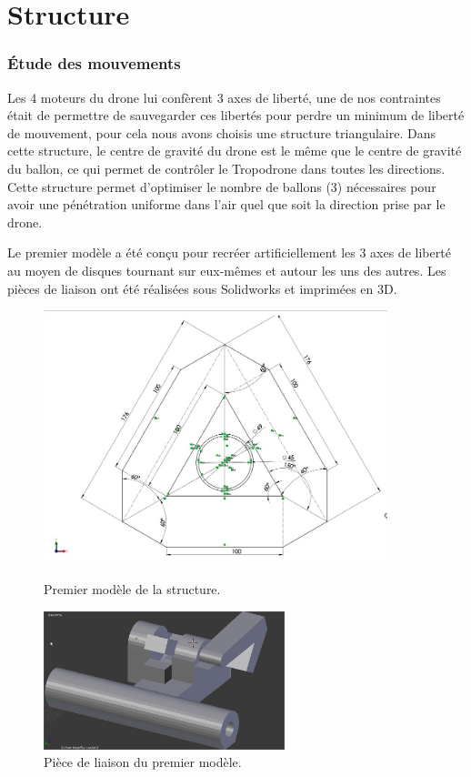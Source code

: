 \documentclass[a4paper,11pt]{article}
\begin{document}
\section{Structure}

\subsubsection{Étude des mouvements}

Les 4 moteurs du drone lui confèrent 3 axes de liberté, une de nos contraintes était de permettre de sauvegarder ces libertés pour perdre un minimum de liberté de mouvement, pour cela nous avons choisis une structure triangulaire. Dans cette structure, le centre de gravité du drone est le même que le centre de gravité du ballon, ce qui permet de contrôler le Tropodrone dans toutes les directions. Cette structure permet d'optimiser le nombre de ballons (3) nécessaires pour avoir une pénétration uniforme dans l'air quel que soit la direction prise par le drone.

Le premier modèle a été conçu pour recréer artificiellement les 3 axes de liberté au moyen de disques tournant sur eux-mêmes et autour les uns des autres. Les pièces de liaison ont été réalisées sous Solidworks et imprimées en 3D.

\begin{figure}[H]
 \centering
 \includegraphics[width=10cm]{../Images/structure0_0.jpg}
 \caption{Premier modèle de la structure.}
 \includegraphics[width=7cm]{../Images/fixation.jpg}
 \caption{Pièce de liaison du premier modèle.} 
\end{figure}
\end{document}
